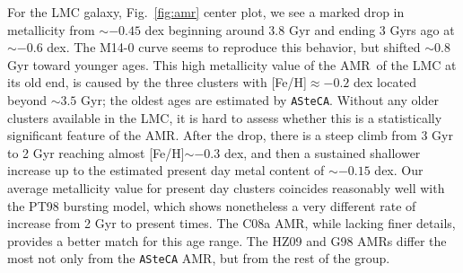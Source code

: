 \documentclass{aa}
\begin{document}
For the LMC galaxy, Fig.~\ref{fig:amr} center plot, we see a marked
drop in metallicity from ${\sim-}0.45$ dex beginning around 3.8 Gyr and
ending 3 Gyrs ago at ${\sim-}0.6$ dex. The M14-0 curve seems to reproduce this
behavior, but shifted ${\sim}0.8$ Gyr toward younger ages.
%
This high metallicity value of the AMR\ of the LMC at its old end, is
caused by the three clusters with [Fe/H]${\approx-0.2}$ dex located beyond
${\sim}3.5$ Gyr; the oldest ages are estimated by \texttt{ASteCA}. Without any older
clusters available in the LMC, it is hard to assess whether this is a
statistically significant feature of the AMR.
%
%
After the drop, there is a steep climb from 3 Gyr to 2 Gyr reaching almost 
[Fe/H]${\sim-}0.3$ dex, and then a sustained shallower increase up
to the estimated present day metal content of ${\sim-}0.15$ dex.
%
Our average metallicity value for present day clusters coincides reasonably
well with the PT98 bursting model, which shows nonetheless a very different
rate of increase from 2 Gyr to present times. The C08a AMR, while lacking finer
details, provides a better match for this age range.
The HZ09 and G98 AMRs differ the most not only from the \texttt{ASteCA}
AMR, but from the rest of the group.
\end{document}
